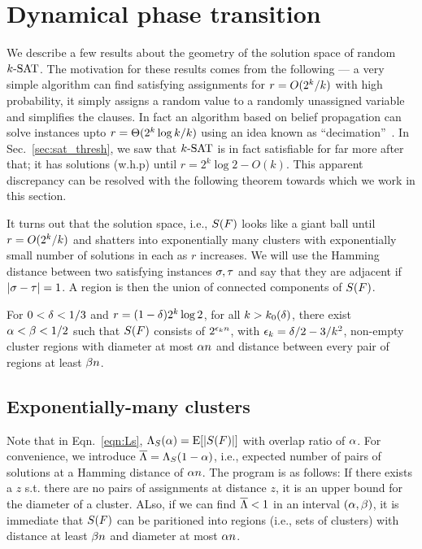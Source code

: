 \documentclass[letterpaper, 10pt, twocolumn, reqno]{amsart}
\begin{document}
\section{Dynamical phase transition}
\label{sec:dynamical_transition}

We describe a few results about the geometry of the solution space of random $\ksat$. The motivation for these results comes from the following --- a very
simple algorithm can find satisfying assignments for $r = \bigo(2^k/k)$ with
high probability, it simply assigns a random value to a randomly unassigned variable and simplifies the clauses. In fact an algorithm based on belief
propagation can solve instances upto $r = \bigth(2^k \log k/k)$ using an idea known as ``decimation''~\cite{montanari2007solving}. In Sec.~\ref{sec:sat_thresh}, we saw that $\ksat$ is in fact satisfiable for far more after that; it has solutions (w.h.p) until $r = 2^k \log 2 - O(k)$. This apparent discrepancy can
be resolved with the following theorem towards which we work in this section.

It turns out that the solution space, i.e., $\sf$ looks like a giant ball
until $r = \bigo(2^k/k)$ and shatters into exponentially many clusters with
exponentially small number of solutions in each as $r$ increases. We will use the Hamming distance between two satisfying instances $\s,\t$ and say that they are adjacent if $\abs{\s-\t} = 1$. A region is then the union of connected components of $\sf$.

\begin{theorem}
For $0 < \d < 1/3$ and $r = (1-\d) 2^k \log 2$, for all $k > k_0(\d)$, there exist $\a < \b < 1/2$ such that $\sf$ consists of $2^{\e_k n}$, with $\e_k = \d/2 - 3/k^2$, non-empty cluster regions with diameter at most $\a n$ and distance between every pair of regions at least $\b n$.
\label{thm:shatter}
\end{theorem}
%

\subsection{Exponentially-many clusters}
\label{ssec:exp_many_clusters}
Note that in Eqn.~\eqref{eqn:Ls}, $\L_S(\a) = \E[\abs{\sf}]$ with overlap ratio of $\a$. For convenience, we introduce $\bL = \L_S(1-\a)$, i.e., expected number of pairs of solutions at a Hamming distance of $\a n$. The program is as follows: If there exists a $z$ s.t. there are no pairs of assignments at distance $z$, it is an upper bound for the diameter of a cluster. ALso, if we can find $\bL <1$ in an interval $(\a, \b)$, it is immediate that $\sf$ can be paritioned into regions (i.e., sets of clusters) with distance at least $\b n$ and diameter at most $\a n$.
\end{document}

